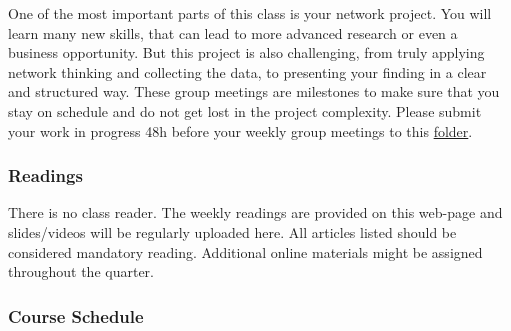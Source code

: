 \documentclass[
]{article}
\begin{document}
One of the most important parts of this class is your network project.
You will learn many new skills, that can lead to more advanced research
or even a business opportunity. But this project is also challenging,
from truly applying network thinking and collecting the data, to
presenting your finding in a clear and structured way. These group
meetings are milestones to make sure that you stay on schedule and do
not get lost in the project complexity. Please submit your work in
progress 48h before your weekly group meetings to this
\href{https://www.dropbox.com/request/xBn5cOnzdW2jT59a1g3W}{folder}.

\hypertarget{readings}{%
\subsubsection{Readings}\label{readings}}

There is no class reader. The weekly readings are provided on this
web-page and slides/videos will be regularly uploaded here. All articles
listed should be considered mandatory reading. Additional online
materials might be assigned throughout the quarter.

\hypertarget{course-schedule}{%
\subsubsection{Course Schedule}\label{course-schedule}}
\end{document}

